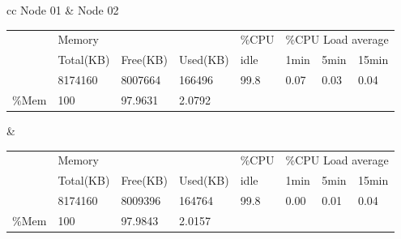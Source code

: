 \documentclass[12pt,a4paper]{report}
\begin{document}
\begin{table}[h!]
\hspace*{-0.9in}
\begin{tabular}{ cc }   %
Node 01 &  Node 02 \\  
\begin{adjustbox}{max width=0.6\textwidth}
\begin{tabular}{l|l|l|l|llll}
\cline{2-8}
\multirow{3}{*}{}           & \multicolumn{3}{l|}{Memory}     & \multicolumn{1}{l|}{\%CPU} & \multicolumn{3}{l|}{\%CPU Load average}                                            \\ \cline{2-8} 
                            & Total(KB) & Free(KB) & Used(KB) & \multicolumn{1}{l|}{idle}  & \multicolumn{1}{l|}{1min} & \multicolumn{1}{l|}{5min} & \multicolumn{1}{l|}{15min} \\ \cline{2-8} 
                            & 8174160   & 8007664  & 166496   & \multicolumn{1}{l|}{99.8}  & \multicolumn{1}{l|}{0.07} & \multicolumn{1}{l|}{0.03} & \multicolumn{1}{l|}{0.04}  \\ \hline
\multicolumn{1}{|l|}{\%Mem} & 100       & 97.9631  & 2.0792   &                            &                           &                           &                            \\ \cline{1-4}
\end{tabular}
\end{adjustbox} &  %
\begin{adjustbox}{max width=0.6\textwidth}
\begin{tabular}{l|l|l|l|llll}
\cline{2-8}
\multirow{3}{*}{}           & \multicolumn{3}{l|}{Memory}     & \multicolumn{1}{l|}{\%CPU} & \multicolumn{3}{l|}{\%CPU Load average}                                            \\ \cline{2-8} 
                            & Total(KB) & Free(KB) & Used(KB) & \multicolumn{1}{l|}{idle}  & \multicolumn{1}{l|}{1min} & \multicolumn{1}{l|}{5min} & \multicolumn{1}{l|}{15min} \\ \cline{2-8} 
                            & 8174160   & 8009396  & 164764   & \multicolumn{1}{l|}{99.8}  & \multicolumn{1}{l|}{0.00} & \multicolumn{1}{l|}{0.01} & \multicolumn{1}{l|}{0.04}  \\ \hline
\multicolumn{1}{|l|}{\%Mem} & 100       & 97.9843  & 2.0157   &                            &                           &                           &                            \\ \cline{1-4}
\end{tabular}
\end{adjustbox}\\
\end{tabular}
\end{table}
\end{document}
